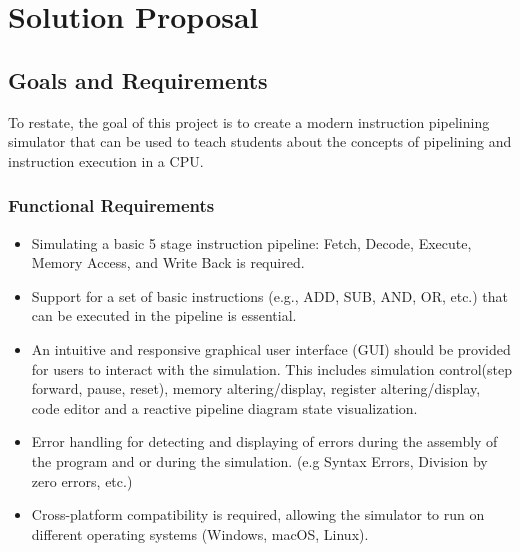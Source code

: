 \chapter{Solution Proposal}
\section{Goals and Requirements}\label{sec:solution}
To restate, the goal of this project is to create a modern instruction pipelining simulator that can be used to teach students about the concepts of pipelining and instruction execution in a CPU.

\subsection{Functional Requirements}
\begin{itemize}
    \item Simulating a basic 5 stage instruction pipeline: Fetch, Decode, Execute, Memory Access, and Write Back is required.
    \item Support for a set of basic instructions (e.g., ADD, SUB, AND, OR, etc.) that can be executed in the pipeline is essential.
    \item An intuitive and responsive graphical user interface (GUI) should be provided for users to interact with the simulation. This includes simulation control(step forward, pause, reset), memory altering/display, register altering/display, code editor and a reactive pipeline diagram state visualization.
    \item Error handling for detecting and displaying of errors during the assembly of the program and or during the simulation. (e.g Syntax Errors, Division by zero errors, etc.)
    \item Cross-platform compatibility is required, allowing the simulator to run on different operating systems (Windows, macOS, Linux).
\end{itemize}
